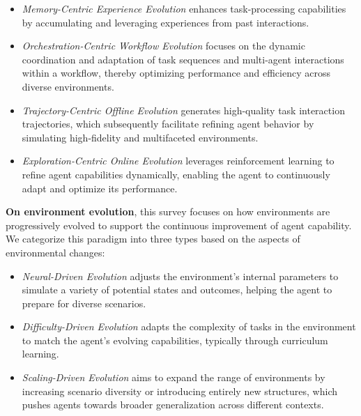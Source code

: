 \documentclass{llmxive}
\begin{document}
\begin{itemize}

\item \textit{Memory-Centric Experience Evolution} enhances task-processing capabilities by accumulating and leveraging experiences from past interactions. 

\item \textit{Orchestration-Centric Workflow Evolution} focuses on the dynamic coordination and adaptation of task sequences and multi-agent interactions within a workflow, thereby optimizing performance and efficiency across diverse environments. 

\item \textit{Trajectory-Centric Offline Evolution} generates high-quality task interaction trajectories, which subsequently facilitate refining agent behavior by simulating high-fidelity and multifaceted environments. 

\item \textit{Exploration-Centric Online Evolution} leverages reinforcement learning  to refine agent capabilities dynamically, enabling the agent to continuously adapt and optimize its performance.

\end{itemize}


\textbf{On environment evolution}, this survey focuses on how environments are progressively evolved to support the continuous improvement of agent capability. We categorize this paradigm into three types based on the aspects of environmental changes:

\begin{itemize}

\item \textit{Neural-Driven Evolution} adjusts the environment’s internal parameters to simulate a variety of potential states and outcomes, helping the agent to prepare for diverse scenarios. 

\item \textit{Difficulty-Driven Evolution} adapts the complexity of tasks in the environment to match the agent's evolving capabilities, typically through curriculum learning. 

\item \textit{Scaling-Driven Evolution} aims to expand the range of environments by increasing scenario diversity or introducing entirely new structures, which pushes agents towards broader generalization across different contexts.

\end{itemize}
\end{document}

